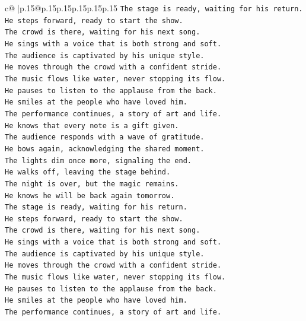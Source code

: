 \documentclass{article}
\begin{document}
{\begin{supertabular}{c@{$\;$}|p{.15\linewidth}@{}p{.15\linewidth}p{.15\linewidth}p{.15\linewidth}p{.15\linewidth}p{.15\linewidth}}
{{{\texttt{The stage is ready, waiting for his return.} \\
\texttt{He steps forward, ready to start the show.} \\
\texttt{The crowd is there, waiting for his next song.} \\
\texttt{He sings with a voice that is both strong and soft.} \\
\texttt{The audience is captivated by his unique style.} \\
\texttt{He moves through the crowd with a confident stride.} \\
\texttt{The music flows like water, never stopping its flow.} \\
\texttt{He pauses to listen to the applause from the back.} \\
\texttt{He smiles at the people who have loved him.} \\
\texttt{The performance continues, a story of art and life.} \\
\texttt{He knows that every note is a gift given.} \\
\texttt{The audience responds with a wave of gratitude.} \\
\texttt{He bows again, acknowledging the shared moment.} \\
\texttt{The lights dim once more, signaling the end.} \\
\texttt{He walks off, leaving the stage behind.} \\
\texttt{The night is over, but the magic remains.} \\
\texttt{He knows he will be back again tomorrow.} \\
\texttt{The stage is ready, waiting for his return.} \\
\texttt{He steps forward, ready to start the show.} \\
\texttt{The crowd is there, waiting for his next song.} \\
\texttt{He sings with a voice that is both strong and soft.} \\
\texttt{The audience is captivated by his unique style.} \\
\texttt{He moves through the crowd with a confident stride.} \\
\texttt{The music flows like water, never stopping its flow.} \\
\texttt{He pauses to listen to the applause from the back.} \\
\texttt{He smiles at the people who have loved him.} \\
\texttt{The performance continues, a story of art and life.} \\
}}}
\end{supertabular}}
\end{document}
